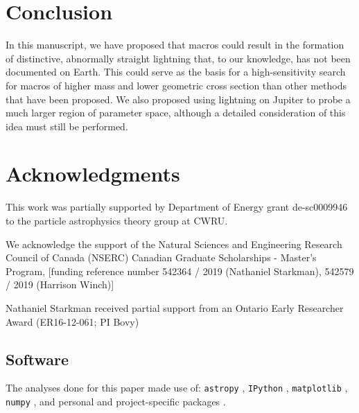 \documentclass[%
 reprint,
 amsmath,amssymb,
 aps,
]{revtex4-2}
\newcommand{\vtwo}[1]{{\color{red} #1}}
\begin{document}

\section{Conclusion} %
\label{sec:conclusion}

    In this manuscript, we have proposed that macros could result in the formation of distinctive, abnormally straight lightning that, to our knowledge, has not been documented on Earth. This could serve as the basis for a high-sensitivity search for macros of higher mass and lower \vtwo{geometric} cross section than other methods that have been proposed. We also proposed using lightning on Jupiter to probe a much larger region of parameter space, although a detailed consideration of this idea must still be performed.



\medskip
\section{Acknowledgments} %
\label{sec:acknowledgements}

    This work was partially supported by Department of Energy grant de-sc0009946 to the particle astrophysics theory group at CWRU.

    We acknowledge the support of the Natural Sciences and Engineering Research Council of Canada (NSERC) Canadian Graduate Scholarships - Master's Program, [funding reference number 542364 / 2019 (Nathaniel Starkman), 542579 / 2019 (Harrison Winch)]
    
    \vtwo{Nathaniel Starkman received partial support from an Ontario Early Researcher Award (ER16-12-061; PI Bovy)}

    \subsection*{Software} %
    \label{sub:software_citation}

        \vtwo{The analyses done for this paper made use of: \texttt{astropy} \citet{code_Astropy2013, code_Astropy2018}, \texttt{IPython} \citet{code_Perez2007}, \texttt{matplotlib} \citet{code_Hunter2007}, \texttt{numpy} \citet{code_Walt2011}, and personal and project-specific packages \citet{code_utilipy2020, code_starkplot2020, code_macrolightning2020}.}
\end{document}
